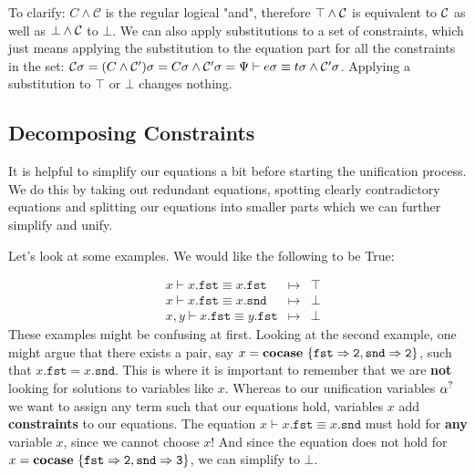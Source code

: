 \documentclass[twoside,12pt,a4paper]{article}
\begin{document}
To clarify: $C \wedge \mathcal{C}$ is the regular logical "and", therefore 
$\top \wedge \mathcal{C}$ is equivalent to $\mathcal{C}$ as well as $\bot \wedge \mathcal{C}$ to $\bot$.
We can also apply substitutions to a set of constraints, which just means applying the substitution to the equation part for all the constraints in the set:
$\mathcal{C} \sigma = (C \wedge \mathcal{C}')\sigma = C \sigma \wedge \mathcal{C}' \sigma  
= \Psi \vdash e\sigma\equiv t\sigma\wedge \mathcal{C}'\sigma$. Applying a substitution to $\top$ or $\bot$ changes nothing.

\subsection{Decomposing Constraints}

It is helpful to simplify our equations a bit before starting the unification process.
We do this by taking out redundant equations, spotting clearly contradictory equations and splitting our equations into smaller parts which we can further simplify and unify.

Let's look at some examples. We would like the following to be True:
\begin{example}
    \begin{align*}
    &x \vdash x.\mathtt{fst} \equiv x.\mathtt{fst} &\mapsto& \top
    \tag{1}\\
    &x \vdash x.\mathtt{fst} \equiv x.\mathtt{snd} &\mapsto& \bot 
    \tag{2}\\
    &x,y \vdash x.\mathtt{fst} \equiv y.\mathtt{fst} &\mapsto& \bot 
    \tag{3}
    \end{align*}
    These examples might be confusing at first. Looking at the second example, one might argue that there exists a pair, say $x = \textbf{cocase}\ \{\mathtt{fst\Rightarrow 2, snd\Rightarrow 2}\}$, such that
    $x.\mathtt{fst} = x.\mathtt{snd}$. This is where it is important to remember that we are \textbf{not} looking for solutions to variables like $x$.
    Whereas to our unification variables $\alpha^?$ we want to assign any term such that our equations hold, variables $x$ add \textbf{constraints} to our equations. 
    The equation $x \vdash x.\mathtt{fst} \equiv x.\mathtt{snd}$ must hold for \textbf{any} variable $x$, since we cannot choose $x$! 
    And since the equation does not hold for $x = \textbf{cocase}\ \{\mathtt{fst\Rightarrow 2, snd\Rightarrow 3}\}$, we can simplify to $\bot$.
\end{example}
\end{document}

